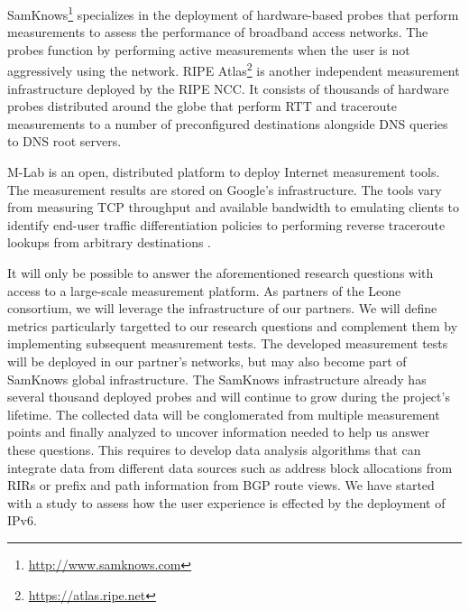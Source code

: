 SamKnows\footnote{\url{http://www.samknows.com}} specializes in the deployment
of hardware-based probes that perform measurements to assess the performance
of broadband access networks. The probes function by performing active
measurements when the user is not aggressively using the network.  RIPE
Atlas\footnote{\url{https://atlas.ripe.net}} is another independent
measurement infrastructure deployed by the \ac{RIPE NCC}. It consists of
thousands of hardware probes distributed around the globe that perform
\ac{RTT} and traceroute measurements to a number of preconfigured destinations
alongside DNS queries to DNS root servers.

\ac{M-Lab} \cite{dovrolis:2010} is an open, distributed platform to deploy
Internet measurement tools. The measurement results are stored on Google's
infrastructure. The tools vary from measuring TCP throughput and available
bandwidth to emulating clients to identify end-user traffic differentiation
policies \cite{dischinger:2010, kanuparthy:2011} to performing reverse
traceroute lookups from arbitrary destinations \cite{bassett:2010}.

It will only be possible to answer the aforementioned research questions with
access to a large-scale measurement platform. As partners of the Leone
consortium, we will leverage the infrastructure of our partners. We will
define metrics particularly targetted to our research questions and complement
them by implementing subsequent measurement tests. The developed measurement
tests will be deployed in our partner's networks, but may also become part of
SamKnows global infrastructure. The SamKnows infrastructure already has
several thousand deployed probes and will continue to grow during the
project's lifetime. The collected data will be conglomerated from multiple
measurement points and finally analyzed to uncover information needed to help
us answer these questions. This requires to develop data analysis algorithms
that can integrate data from different data sources such as address block
allocations from \ac{RIR}s or prefix and path information from BGP route
views. We have started with a study to assess how the user experience is
effected by the deployment of IPv6.
